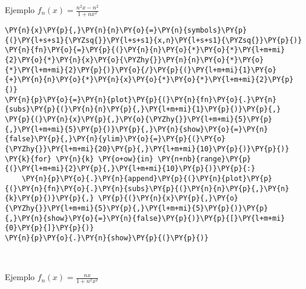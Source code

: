     Ejemplo \(f_n(x)=\frac{n^2x-n^2}{1+nx^2}\)

    \begin{tcolorbox}[breakable, size=fbox, boxrule=1pt, pad at break*=1mm,colback=cellbackground, colframe=cellborder]
\begin{Verbatim}[commandchars=\\\{\}]
\PY{n}{x}\PY{p}{,}\PY{n}{n}\PY{o}{=}\PY{n}{symbols}\PY{p}{(}\PY{l+s+s1}{\PYZsq{}}\PY{l+s+s1}{x,n}\PY{l+s+s1}{\PYZsq{}}\PY{p}{)}
\PY{n}{fn}\PY{o}{=}\PY{p}{(}\PY{n}{n}\PY{o}{*}\PY{o}{*}\PY{l+m+mi}{2}\PY{o}{*}\PY{n}{x}\PY{o}{\PYZhy{}}\PY{n}{n}\PY{o}{*}\PY{o}{*}\PY{l+m+mi}{2}\PY{p}{)}\PY{o}{/}\PY{p}{(}\PY{l+m+mi}{1}\PY{o}{+}\PY{n}{n}\PY{o}{*}\PY{n}{x}\PY{o}{*}\PY{o}{*}\PY{l+m+mi}{2}\PY{p}{)}
\PY{n}{p}\PY{o}{=}\PY{n}{plot}\PY{p}{(}\PY{n}{fn}\PY{o}{.}\PY{n}{subs}\PY{p}{(}\PY{n}{n}\PY{p}{,}\PY{l+m+mi}{1}\PY{p}{)}\PY{p}{,} \PY{p}{(}\PY{n}{x}\PY{p}{,}\PY{o}{\PYZhy{}}\PY{l+m+mi}{5}\PY{p}{,}\PY{l+m+mi}{5}\PY{p}{)}\PY{p}{,}\PY{n}{show}\PY{o}{=}\PY{n}{false}\PY{p}{,}\PY{n}{ylim}\PY{o}{=}\PY{p}{(}\PY{o}{\PYZhy{}}\PY{l+m+mi}{20}\PY{p}{,}\PY{l+m+mi}{10}\PY{p}{)}\PY{p}{)}
\PY{k}{for} \PY{n}{k} \PY{o+ow}{in} \PY{n+nb}{range}\PY{p}{(}\PY{l+m+mi}{2}\PY{p}{,}\PY{l+m+mi}{10}\PY{p}{)}\PY{p}{:}
    \PY{n}{p}\PY{o}{.}\PY{n}{append}\PY{p}{(}\PY{n}{plot}\PY{p}{(}\PY{n}{fn}\PY{o}{.}\PY{n}{subs}\PY{p}{(}\PY{n}{n}\PY{p}{,}\PY{n}{k}\PY{p}{)}\PY{p}{,} \PY{p}{(}\PY{n}{x}\PY{p}{,}\PY{o}{\PYZhy{}}\PY{l+m+mi}{5}\PY{p}{,}\PY{l+m+mi}{5}\PY{p}{)}\PY{p}{,}\PY{n}{show}\PY{o}{=}\PY{n}{false}\PY{p}{)}\PY{p}{[}\PY{l+m+mi}{0}\PY{p}{]}\PY{p}{)}
\PY{n}{p}\PY{o}{.}\PY{n}{show}\PY{p}{(}\PY{p}{)}
\end{Verbatim}
\end{tcolorbox}

    \begin{center}
    \end{center}
    { \hspace*{\fill} \\}
    
    Ejemplo \(f_n(x)=\frac{nx}{1+n^2x^2}\)

